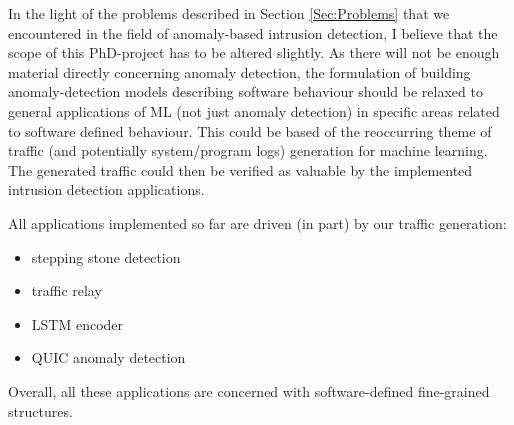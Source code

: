 \documentclass[a4paper,12pt,twoside]{article}
\begin{document}
In the light of the problems described in Section \ref{Sec:Problems} that we encountered in the field of anomaly-based intrusion detection, I believe that the scope of this PhD-project has to be altered slightly. As there will not be enough material directly concerning anomaly detection, the formulation of building anomaly-detection models describing software behaviour should be relaxed to general applications of ML (not just anomaly detection) in specific areas related to software defined behaviour. This could be based of the reoccurring theme of traffic (and potentially system/program logs) generation for machine learning. The generated traffic could then be verified as valuable by the implemented intrusion detection applications.

All applications implemented so far are driven (in part) by our traffic generation:
\begin{itemize}
\item stepping stone detection
\item traffic relay
\item LSTM encoder
\item QUIC anomaly detection
\end{itemize}

Overall, all these applications are concerned with software-defined fine-grained structures.




\end{document}
